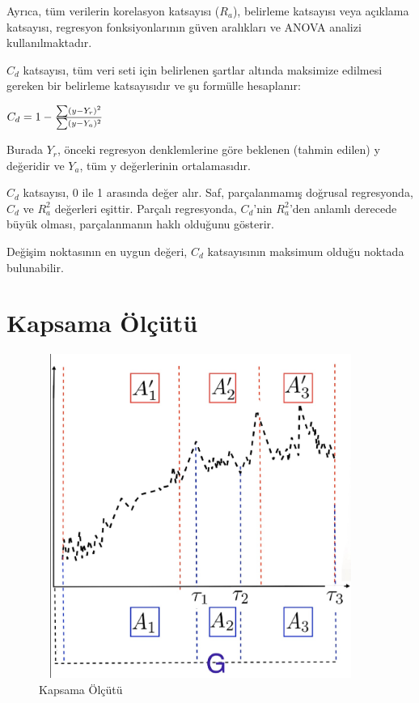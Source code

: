 \documentclass[12pt,twoside]{deuthesis}
\begin{document}
Ayrıca, tüm verilerin korelasyon katsayısı (\(R_{a}\)), belirleme katsayısı veya açıklama katsayısı, regresyon fonksiyonlarının güven aralıkları ve ANOVA analizi kullanılmaktadır.

\(C_{d}\) katsayısı, tüm veri seti için belirlenen şartlar altında maksimize edilmesi gereken bir belirleme katsayısıdır ve şu formülle hesaplanır:

\(C_{d}=1-{\sum (y-Y_{r})^{2} \over \sum (y-Y_{a})^{2}}\)

Burada \(Y_{r}\), önceki regresyon denklemlerine göre beklenen (tahmin edilen) y değeridir ve \(Y_{a}\), tüm y değerlerinin ortalamasıdır.

\(C_{d}\) katsayısı, 0 ile 1 arasında değer alır. Saf, parçalanmamış doğrusal regresyonda, \(C_{d}\) ve \(R_{a}^2\) değerleri eşittir. Parçalı regresyonda, \(C_{d}\)'nin \(R_{a}^2\)'den anlamlı derecede büyük olması, parçalanmanın haklı olduğunu gösterir.

Değişim noktasının en uygun değeri, \(C_{d}\) katsayısının maksimum olduğu noktada bulunabilir.

\hypertarget{kapsama-uxf6luxe7uxfctuxfc}{%
\section{Kapsama Ölçütü}\label{kapsama-uxf6luxe7uxfctuxfc}}

\begin{figure}
\includegraphics[width=400px,height=400px]{figure/cover} \caption{Kapsama Ölçütü}\label{fig:unnamed-chunk-1}
\end{figure}
\end{document}
